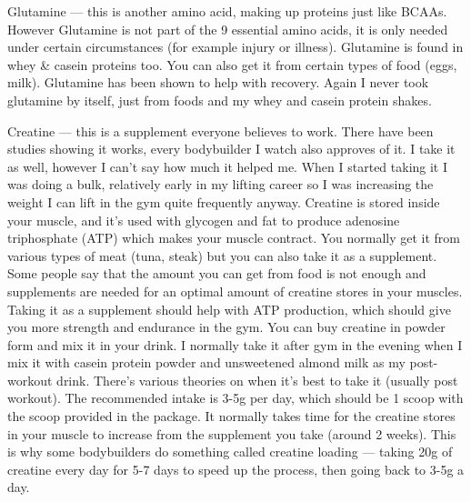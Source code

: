\documentclass[openany, 12pt]{book}
\begin{document}
        Glutamine --- this is another amino acid, making up proteins just like BCAAs. However Glutamine is
        not part of the 9 essential amino acids, it is only needed under certain circumstances (for example injury or illness). Glutamine is found in whey \& casein proteins too. You can also get
        it from certain types of food (eggs, milk). Glutamine has been shown to help with recovery. Again I never took glutamine by itself, just from foods and my whey and casein protein shakes.

        Creatine --- this is a supplement everyone believes to work. There have been studies
        showing it works, every bodybuilder I watch also approves of it. I take it as well, however I can't say how much it helped me. When I started taking it I was doing a bulk, relatively
        early in my lifting career so I was increasing the weight I can lift in the gym quite frequently anyway. Creatine is stored inside your muscle, and it's used with glycogen and fat to produce
        adenosine triphosphate (ATP) which makes your muscle contract. You normally get it from various types of meat (tuna, steak) but you can also take it as a supplement. Some people say that
        the amount you can get from food is not enough and supplements are needed for an optimal amount of creatine stores in your muscles.
        Taking it as a supplement should help with ATP production, which should give you more strength and endurance in the gym.
        You can buy creatine in powder form and mix it in your drink. I normally take it after gym in the evening when I mix it with casein protein powder and unsweetened almond milk as my
        post-workout drink. There's various theories on when it's best to take it (usually post workout).
        The recommended intake is 3-5g per day, which should be 1 scoop with the scoop provided in the package. It normally takes time for the creatine stores in your muscle
        to increase from the supplement you take (around 2 weeks). This is why some bodybuilders do something called creatine loading --- taking 20g of creatine every day for 5-7
        days to speed up the process, then going back to 3-5g a day.
\end{document}
